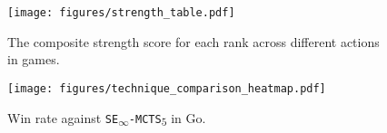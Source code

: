 


\begin{figure}[ht]
\centering
\begin{minipage}{0.7\textwidth}
    \texttt{[image: figures/strength\_table.pdf]}
    \caption{The composite strength score for each rank across different actions in games.}
    \label{fig:move_strength}
\end{minipage}\hfill
\begin{minipage}{0.28\textwidth}
    \texttt{[image: figures/technique\_comparison\_heatmap.pdf]}
    \caption{Win rate against \texttt{SE\textsubscript{$\infty$}-MCTS\textsubscript{$5$}} in Go.}
    \label{fig:win_heatmap}
\end{minipage}
\end{figure}


%




